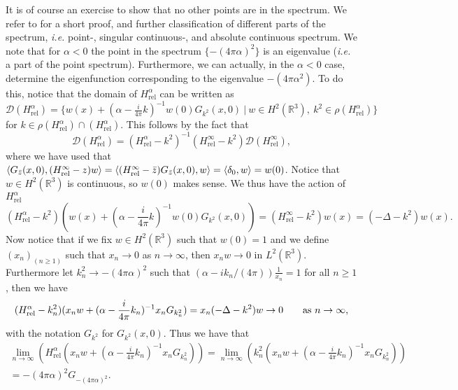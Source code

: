 \documentclass[a4paper,11pt]{article}
\newcommand{\dom}[1]{\mathscr D\left(#1\right)}
\newcommand{\ie}{\emph{i.e.} }
\newcommand{\R}{\mathbb{R}}
\numberwithin{equation}{section}
\begin{document}
It is of course an exercise to show that no other points are in the spectrum. We refer to \cite{albeverio2012solvable} for a short proof, and further classification of different parts of the spectrum, \ie point-, singular continuous-, and absolute continuous spectrum. 
We note that for $ \alpha<0 $ the point in the spectrum $ \{-(4\pi\alpha)^2\} $ is an eigenvalue (\ie a part of the point spectrum). Furthermore, we can actually, in the $ \alpha<0 $ case, determine the eigenfunction corresponding to the eigenvalue $ -(4\pi\alpha^2) $. To do this, notice that the domain of $ H_{\text{rel}}^\alpha $ can be written as\\ $ \dom{H_{\text{rel}}^\alpha}=\{w(x)+(\alpha-\frac{i}{4\pi}k)^{-1}w(0)G_{k^2}(x,0)\ |\ w\in H^2(\R^3),\ k^2\in\rho(H_{\text{rel}}^\alpha)\} $ for $ k\in\rho(H_{\text{rel}}^\alpha)\cap(H_{\text{rel}}^\alpha) $. This follows by the fact that \begin{equation}
\dom{H_{\text{rel}}^\alpha}=(H_{\text{rel}}^\alpha-k^2)^{-1}(H_{\text{rel}}^\infty-k^2)\dom{H_{\text{rel}}^\infty},
\end{equation}
where we have used that $ \braket{G_{\bar{z}}(x,0),(H_{\text{rel}}^\infty-z)w}=\braket{(H_{\text{rel}}^\infty-\bar{z})G_{\bar{z}}(x,0),w}=\braket{\delta_0,w}=w(0) $. Notice that $ w\in H^2(\R^3) $ is continuous, so $ w(0) $ makes sense. We thus have the action of $ H_{\text{rel}}^\alpha $\begin{equation}
(H_{\text{rel}}^\alpha-k^2)(w(x)+(\alpha-\frac{i}{4\pi}k)^{-1}w(0)G_{k^2}(x,0))=(H_{\text{rel}}^\infty-k^2)w(x)=(-\Delta-k^2)w(x).
\end{equation}
Now notice that if we fix $ w\in H^2(\R^3) $ such that $ w(0)=1 $ and we define $ (x_n)_{(n\geq1)} $ such that $ x_n\to0 $ as $ n\to\infty $, then $ x_nw\to0 $ in $ L^2(\R^3) $. Furthermore let $ k_n^2\to-(4\pi\alpha)^2 $ such that $ \left(\alpha-ik_n/(4\pi)\right)\frac{1}{x_n}=1 $ for all $ n\geq1 $, then we have \begin{equation}
(H_{\text{rel}}^\alpha-k_n^2)(x_nw+(\alpha-\frac{i}{4\pi}k_n)^{-1}x_nG_{k_n^2})=x_n(-\Delta-k^2)w\to 0\qquad \text{as $ n\to\infty $},
\end{equation}
with the notation $ G_{k^2} $ for $ G_{k^2}(x,0) $. Thus we have that \begin{equation}
\begin{aligned}
\lim_{n\to\infty}\left(H_{\text{rel}}^\alpha(x_nw+(\alpha-\frac{i}{4\pi}k_n)^{-1}x_nG_{k_n^2})\right)=\lim\limits_{n\to\infty}\left(k_n^2(x_nw+(\alpha-\frac{i}{4\pi}k_n)^{-1}x_nG_{k_n^2})\right)\\= -(4\pi\alpha)^2G_{-(4\pi\alpha)^2}.
\end{aligned}
\end{equation}
\end{document}
